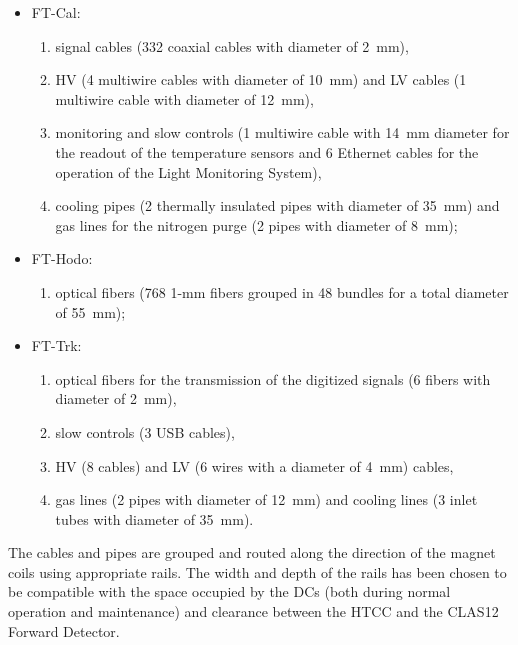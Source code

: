 \begin{itemize}
\item{FT-Cal:}
\begin{enumerate}
\item{signal cables (332 coaxial cables with diameter of 2~mm),}
\item{HV (4 multiwire cables with diameter of 10~mm) and LV cables (1 multiwire cable with diameter of 12~mm),}
\item{monitoring and slow controls (1 multiwire cable with 14~mm diameter for the readout of the temperature
  sensors and 6 Ethernet cables for the operation of the Light Monitoring System),}
\item{cooling pipes (2 thermally insulated pipes with diameter of 35~mm) and gas lines for the nitrogen purge
  (2 pipes with diameter of 8~mm);}
\end{enumerate}
\item{FT-Hodo:}
\begin{enumerate}
\item{optical fibers (768 1-mm fibers grouped in 48 bundles for a total diameter of 55~mm);}
\end{enumerate}
\item{FT-Trk:}
\begin{enumerate}
\item{optical fibers for the transmission of the digitized signals (6 fibers with diameter of 2~mm),}
\item{slow controls (3 USB cables),}
\item{HV (8 cables) and LV (6 wires with a diameter of 4~mm) cables,}
\item{gas lines (2 pipes with diameter of 12~mm) and cooling lines (3 inlet tubes with diameter of 35~mm).}
\end{enumerate}
\end{itemize}

The cables and pipes are grouped and routed along the direction of the magnet coils using appropriate rails. The
width and depth of the rails has been chosen to be compatible with the space occupied by the DCs (both during
normal operation and maintenance) and clearance between the HTCC and the CLAS12 Forward Detector.
